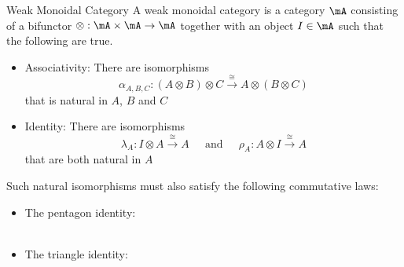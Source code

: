 \documentclass[a4paper]{article}
\begin{document}
\begin{defn}{Weak Monoidal Category}{} A weak monoidal category is a category $\mA$ consisting of a bifunctor $\otimes:\mA\times\mA\to\mA$ together with an object $I\in\mA$ such that the following are true. 
\begin{itemize}
\item Associativity: There are isomorphisms $$\alpha_{A,B,C}:(A\otimes B)\otimes C\overset{\cong}{\longrightarrow} A\otimes(B\otimes C)$$ that is natural in $A$, $B$ and $C$
\item Identity: There are isomorphisms $$\lambda_A:I\otimes A\overset{\cong}{\longrightarrow} A\;\;\;\;\text{ and }\;\;\;\;\rho_A:A\otimes I\overset{\cong}{\longrightarrow} A$$ that are both natural in $A$
\end{itemize}
Such natural isomorphisms must also satisfy the following commutative laws: 
\begin{itemize}
\item The pentagon identity: \\
\\
\item The triangle identity: \\
\\
\end{itemize}
\end{defn}
\end{document}
